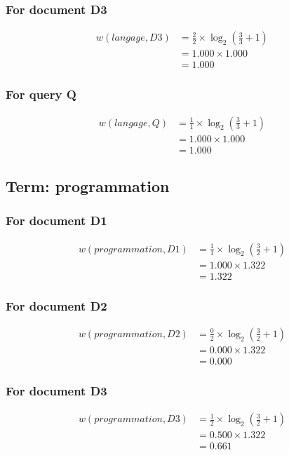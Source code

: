 \documentclass{article}
\begin{document}
\subsubsection*{For document D3}
\begin{align}
w(langage, D3) &= \frac{2}{2} \times \log_{2}\left(\frac{3}{3} + 1\right) \\
&= 1.000 \times 1.000 \\
&= 1.000
\end{align}

\subsubsection*{For query Q}
\begin{align}
w(langage, Q) &= \frac{1}{1} \times \log_{2}\left(\frac{3}{3} + 1\right) \\
&= 1.000 \times 1.000 \\
&= 1.000
\end{align}

\subsection{Term: programmation}
\subsubsection*{For document D1}
\begin{align}
w(programmation, D1) &= \frac{1}{1} \times \log_{2}\left(\frac{3}{2} + 1\right) \\
&= 1.000 \times 1.322 \\
&= 1.322
\end{align}

\subsubsection*{For document D2}
\begin{align}
w(programmation, D2) &= \frac{0}{2} \times \log_{2}\left(\frac{3}{2} + 1\right) \\
&= 0.000 \times 1.322 \\
&= 0.000
\end{align}

\subsubsection*{For document D3}
\begin{align}
w(programmation, D3) &= \frac{1}{2} \times \log_{2}\left(\frac{3}{2} + 1\right) \\
&= 0.500 \times 1.322 \\
&= 0.661
\end{align}
\end{document}
